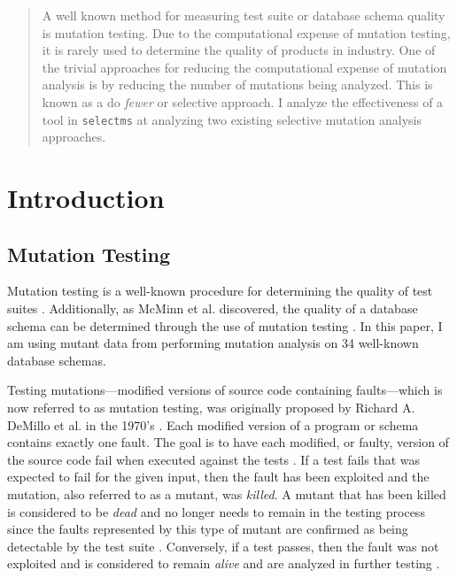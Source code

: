 \documentclass[conference]{IEEEtran}
\begin{document}
\begin{abstract}
    A well known method for measuring test suite or database schema quality is mutation testing.
    Due to the computational expense of mutation testing, it is
    rarely used to determine the quality of products in industry. One
    of the trivial approaches for reducing the computational expense of
    mutation analysis is by reducing the number of mutations being analyzed.
    This is known as a do \textit{fewer} or selective approach. I analyze the effectiveness
    of a tool in \texttt{selectms} at analyzing two existing selective mutation analysis approaches.
\end{abstract}

%
\IEEEpeerreviewmaketitle

\section{Introduction}
\subsection{Mutation Testing}

Mutation testing is a well-known procedure for determining the quality of test
suites \cite{gopinath2015empirical}. Additionally, as McMinn et al. discovered, the quality of a database schema
can be determined through the use of mutation testing \cite{mcminn2015effectiveness}. In
this paper, I am using mutant data from performing mutation analysis on 34 well-known database schemas.

Testing mutations---modified versions of source code containing faults---which is now
referred to as mutation testing, was originally proposed by Richard A. DeMillo et al.
in the 1970's \cite{demillo1978hints}. Each modified version of a program or schema contains
exactly one fault. The goal is to have each modified, or faulty, version of the source code
fail when executed against the tests \cite{offutt1993experimental}. If a test fails that was expected to fail
for the given input, then the fault has been exploited and the mutation, also referred to as a mutant,
was \textit{killed}. A mutant that has been killed is considered to be \textit{dead} and no
longer needs to remain in the testing process since the faults represented by this type of
mutant are confirmed as being detectable by the test suite \cite{offutt1993experimental}.
Conversely, if a test passes, then the fault was not exploited and is considered to remain
\textit{alive} and are analyzed in further testing \cite{mcminnvirtual}.
\end{document}
